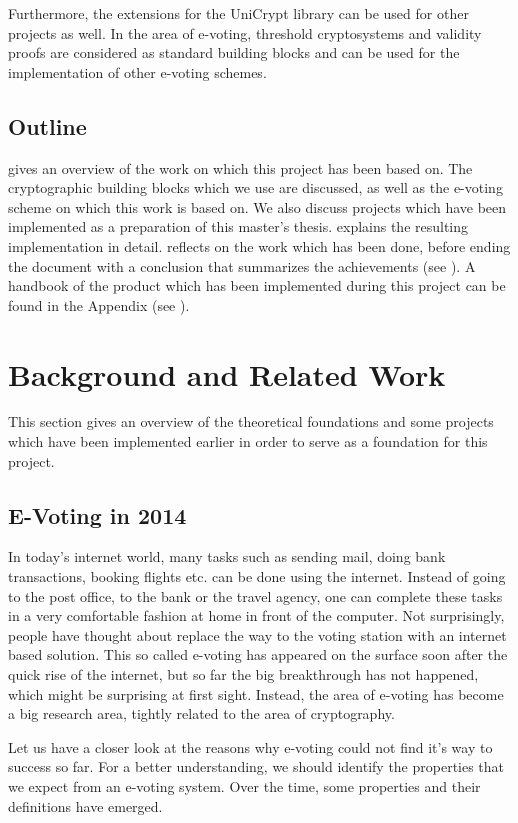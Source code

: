 \documentclass[numbers=noenddot, abstract=on, a4paper, headsepline,
footsepline, oneside, draft=off]{scrreprt}
\newcommand{\myref}[1]{(see \Vref{#1})}
\begin{document}
Furthermore, the extensions for the UniCrypt library can be used for other
projects as well. In the area of e-voting, threshold cryptosystems and validity
proofs are considered as standard building blocks and can be used for the
implementation of other e-voting schemes.

\section{Outline}
 gives an overview of the work on which this project has
been based on. The cryptographic building blocks which we use are discussed,
as well as the e-voting scheme on which this work is based on. We also discuss
projects which have been implemented as a preparation of this master's thesis.
 explains the resulting implementation in detail.
 reflects on the work which has been done, before ending
the document with a conclusion that summarizes the achievements
\myref{cha:conclusion}.
A handbook of the product which has been implemented during this project can be found in the
Appendix \myref{cha:handbook}.

\chapter{Background and Related Work}
\label{cha:brw}
This section gives an overview of the theoretical foundations and some projects
which have been implemented earlier in order to serve as a foundation for this
project. 

\section{E-Voting in 2014}
\label{sec:evoting}
In today's internet world, many tasks such as sending mail, doing bank
transactions, booking flights etc. can be done using the internet. Instead of
going to the post office, to the bank or the travel agency, one can complete
these tasks in a very comfortable fashion at home in front of the computer. Not
surprisingly, people have thought about replace the way to the voting station
with an internet based solution. This so called e-voting has appeared on the
surface soon after the quick rise of the internet, but so far the big
breakthrough has not happened, which might be surprising at first sight.
Instead, the area of e-voting has become a big research area, tightly related to
the area of cryptography.

Let us have a closer look at the reasons why e-voting
could not find it's way to success so far. For a better understanding, we should
identify the properties that we expect from an e-voting system. Over the time,
some properties and their definitions have emerged.
\end{document}

